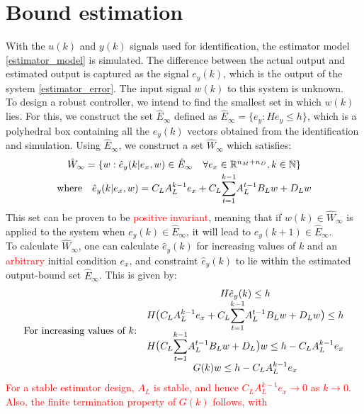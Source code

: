 \documentclass[a4paper]{article}
\begin{document}
\section{Bound estimation}
With the $u(k)$ and $y(k)$ signals used for identification, the estimator model \eqref{estimator_model} is simulated. The difference between the actual output and estimated output is captured as the signal $e_y(k)$, which is the output of the system \eqref{estimator_error}. The input signal $w(k)$ to this system is unknown. \\
 To design a robust controller, we intend to find the smallest set in which $w(k)$ lies. For this, we construct the set $\hat{E}_\infty$ defined as $\hat{E}_\infty = \{e_y: He_y \leq h \}$, which is a polyhedral box containing all the $e_y(k)$ vectors obtained from the identification and simulation. Using $\hat{E}_\infty$, we construct a set $\hat{W}_\infty$ which satisfies:
 \begin{equation}
 \begin{matrix}
 \hat{W}_\infty = \{ w: \hat{e}_y(k|e_x,w) \in \hat{E}_\infty \hspace{10pt} \forall e_x \in \mathbb{R}^{n_M+n_D}, k \in \mathbb{N} \}\\ \vspace{-10pt} \\
 \text{where} \hspace{10pt}
 \hat{e}_y(k|e_x,w)= C_LA_L^{k-1}e_x+C_L\mathlarger{\sum}\limits_{t=1}^{k-1}A_L^{t-1}B_Lw+D_Lw
 \end{matrix}
 \end{equation}
This set can be proven to be \textcolor{red}{positive invariant}, meaning that if $w(k) \in \hat{W}_{\infty}$ is applied to the system when $e_y(k) \in \hat{E}_{\infty}$, it will lead to $e_y(k+1) \in \hat{E}_{\infty}$. \\
To calculate $\hat{W}_{\infty}$, one can calculate $\hat{e}_y(k)$ for increasing values of $k$ and an \textcolor{red}{arbitrary} initial condition $e_x$, and constraint $\hat{e}_y(k)$ to lie within the estimated output-bound set $\hat{E}_\infty$. This is given by:
\begin{equation}
\begin{matrix}
\text{For increasing values of $k$:} &
\begin{matrix}
H\hat{e}_y(k) \leq h \\
H\text{\large{(}}C_LA_L^{k-1}e_x+C_L\mathlarger{\sum}\limits_{t=1}^{k-1}A_L^{t-1}B_Lw+D_Lw\text{\large{)}} \leq h \\
H\text{\large{(}}C_L\mathlarger{\sum}\limits_{t=1}^{k-1}A_L^{t-1}B_Lw+D_L\text{\large{)}}w \leq h-C_LA_L^{k-1}e_x \\
G(k)w \leq h-C_LA_L^{k-1}e_x
\end{matrix}
\end{matrix}
\end{equation}
\textcolor{red}{For a stable estimator design, $A_L$ is stable, and hence $C_LA_L^{k-1}e_x \rightarrow 0$ as $k \rightarrow 0$. Also, the finite termination property of $G(k)$ follows, with}


\end{document}
